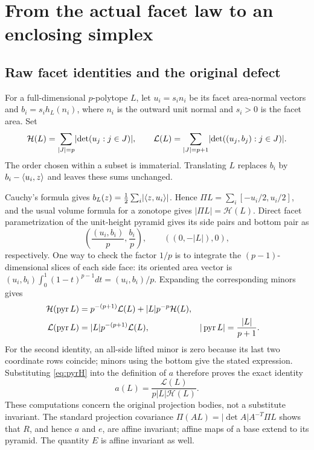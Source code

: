 \section{From the actual facet law to an enclosing simplex}
\label{sec:enclosure}
\subsection{Raw facet identities and the original defect}
For a full-dimensional $p$-polytope $L$, let $u_i=s_i n_i$ be its
facet area-normal vectors and $b_i=s_i h_L(n_i)$, where $n_i$ is the
outward unit normal and $s_i>0$ is the facet area. Set
\begin{equation}\label{eq:rawsums}
 \mathcal H(L)=\sum_{|J|=p}\lvert \det(u_j:j\in J)\rvert,\qquad
 \mathcal L(L)=\sum_{|J|=p+1}\lvert \det((u_j,b_j):j\in J)\rvert.
\end{equation}
The order chosen within a subset is immaterial. Translating $L$ replaces
$b_i$ by $b_i-\langle u_i,z\rangle$ and leaves these sums unchanged.

Cauchy's formula gives $b_L(z)=\frac12\sum_i\lvert \langle z,u_i\rangle\rvert$.
Hence $\Pi L=\sum_i[-u_i/2,u_i/2]$, and the usual volume formula for a
zonotope gives $|\Pi L|=\mathcal H(L)$. Direct facet parametrization of the
unit-height pyramid gives its side pairs and bottom pair as
\begin{equation}\label{eq:pyrfacets}
 \left(\frac{(u_i,b_i)}p,\frac{b_i}p\right),\qquad ((0,-|L|),0),
\end{equation}
respectively. One way to check the factor $1/p$ is to integrate the
$(p-1)$-dimensional slices of each side face: its oriented area vector is
$(u_i,b_i)\int_0^1(1-t)^{p-1}dt=(u_i,b_i)/p$.
Expanding the corresponding minors gives
\begin{align}
 \mathcal H(\operatorname{pyr} L)&=p^{-(p+1)}\mathcal L(L)
                     +|L|p^{-p}\mathcal H(L),\label{eq:pyrH}\\
 \mathcal L(\operatorname{pyr} L)&=|L|p^{-(p+1)}\mathcal L(L),
 &|\operatorname{pyr} L|&=\frac{|L|}{p+1}.\label{eq:pyrL}
\end{align}
For the second identity, an all-side lifted minor is zero because its
last two coordinate rows coincide; minors using the bottom give the
stated expression. Substituting \eqref{eq:pyrH} into the definition of $a$
therefore proves the exact identity
\begin{equation}\label{eq:a_raw}
 a(L)=\frac{\mathcal L(L)}{p|L|\mathcal H(L)}.
\end{equation}
These computations concern the original projection bodies, not a substitute
invariant. The standard projection covariance
$\Pi(AL)=|\det A|A^{-T}\Pi L$ shows that $R$, and hence $a$ and $e$,
are affine invariant; affine maps of a base extend to its pyramid.
The quantity $E$ is affine invariant as well.

